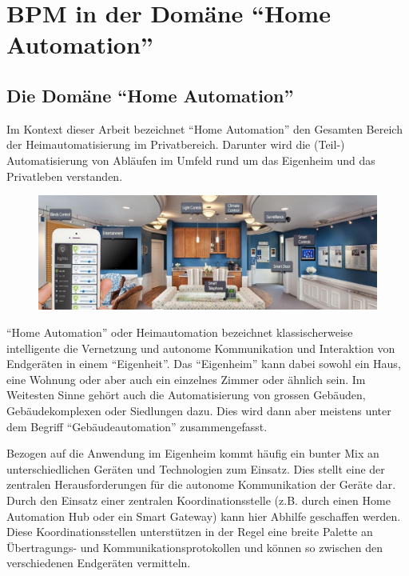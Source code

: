 
\chapter{BPM in der Domäne "`Home Automation"'}

\section{Die Domäne "`Home Automation"'}
Im Kontext dieser Arbeit bezeichnet "`Home Automation"' den Gesamten Bereich der Heimautomatisierung im Privatbereich. Darunter wird die (Teil-) Automatisierung von Abläufen im Umfeld rund um das Eigenheim und das Privatleben verstanden.

\begin{figure}[H]
  \centering
  \includegraphics[width=15cm]{./images/home_automation_system}

\end{figure}
"`Home Automation"' oder Heimautomation bezeichnet klassischerweise intelligente die Vernetzung und autonome Kommunikation und Interaktion von Endgeräten in einem "`Eigenheit"'. Das "`Eigenheim"' kann dabei sowohl ein Haus, eine Wohnung oder aber auch ein einzelnes Zimmer oder ähnlich sein. Im Weitesten Sinne gehört auch die Automatisierung von grossen Gebäuden, Gebäudekomplexen oder Siedlungen dazu. Dies wird dann aber meistens unter dem Begriff "`Gebäudeautomation"' zusammengefasst.

Bezogen auf die Anwendung im Eigenheim kommt häufig ein bunter Mix an unterschiedlichen Geräten und Technologien zum Einsatz. Dies stellt eine der zentralen Herausforderungen für die autonome Kommunikation der Geräte dar. Durch den Einsatz einer zentralen Koordinationsstelle (z.B. durch einen Home Automation Hub oder ein Smart Gateway) kann hier Abhilfe geschaffen werden. Diese Koordinationsstellen unterstützen in der Regel eine breite Palette an Übertragungs- und Kommunikationsprotokollen und können so zwischen den verschiedenen Endgeräten vermitteln. 

